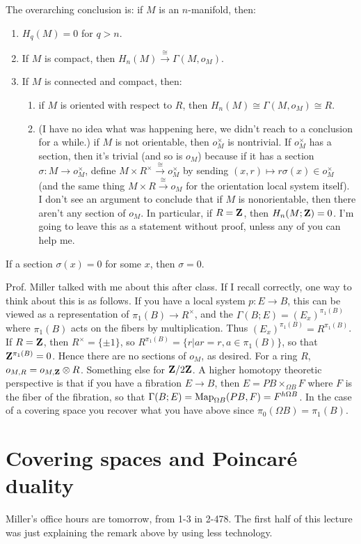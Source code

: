 The overarching conclusion is: if $M$ is an $n$-manifold, then:
\begin{enumerate}
\item $H_q(M)=0$ for $q>n$.
\item If $M$ is compact, then $H_n(M)\xrightarrow{\cong}\Gamma(M,o_M)$.
\item If $M$ is connected and compact, then:
	\begin{enumerate}
	\item if $M$ is oriented with respect to $R$, then $H_n(M)\cong \Gamma(M,o_M)\cong R$.
	\item (I have no idea what was happening here, we didn't reach to a conclusion for a while.) if $M$ is not orientable, then $o_M^\times$ is nontrivial. If $o_M^\times$ has a section, then it's trivial (and so is $o_M$) because if it has a section $\sigma:M\to o^\times_M$, define $M\times R^\times\xrightarrow{\cong} o_M^\times$ by sending $(x,r)\mapsto r\sigma(x)\in o_M^\times$ (and the same thing $M\times R\xrightarrow{\cong} o_M$ for the orientation local system itself). I don't see an argument to conclude that if $M$ is nonorientable, then there aren't any section of $o_M$. In particular, if $R=\mathbf Z$, then $H_n(M;\mathbf Z)=0$. I'm going to leave this as a statement without proof, unless any of you can help me.
	\end{enumerate}
\end{enumerate}
If a section $\sigma(x)=0$ for some $x$, then $\sigma=0$.
\begin{remark}
Prof. Miller talked with me about this after class. If I recall correctly, one way to think about this is as follows. If you have a local system $p:E\to B$, this can be viewed as a representation of $\pi_1(B)\to R^\times$, and the $\Gamma(B;E)=(E_x)^{\pi_1(B)}$ where $\pi_1(B)$ acts on the fibers by multiplication. Thus $(E_x)^{\pi_1(B)}=R^{\pi_1(B)}$. If $R=\mathbf Z$, then $R^\times=\{\pm 1\}$, so $R^{\pi_1(B)}=\{r|ar=r,a\in\pi_1(B)\}$, so that $\mathbf Z^{\pi_1(B)}=0$. Hence there are no sections of $o_M$, as desired. For a ring $R$, $o_{M,R}=o_{M,\mathbf Z}\otimes R$. Something else for $\mathbf Z/2\mathbf Z$. A higher homotopy theoretic perspective is that if you have a fibration $E\to B$, then $E=PB\times_{\Omega B}F$ where $F$ is the fiber of the fibration, so that $\Gamma(B;E)=\operatorname{Map}_{\Omega B}(PB,F)=F^{h\Omega B}$. In the case of a covering space you recover what you have above since $\pi_0(\Omega B)=\pi_1(B)$.
\end{remark}
\section{Covering spaces and Poincar\'{e} duality}
Miller's office hours are tomorrow, from 1-3 in 2-478. The first half of this lecture was just explaining the remark above by using less technology.

